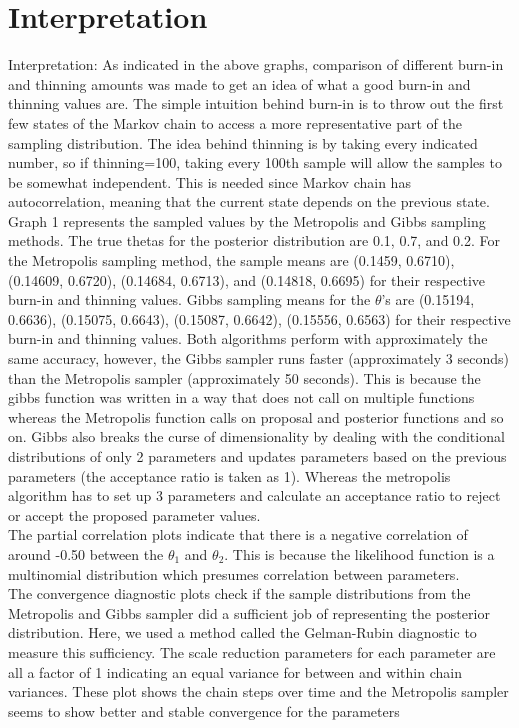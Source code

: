 \documentclass[11pt,a4paper]{article}
\begin{document}
\section*{Interpretation}
Interpretation:
As indicated in the above graphs, comparison of different burn-in and thinning amounts was made to get an idea of what a good burn-in and thinning values are. The simple intuition behind burn-in is to throw out the first few states of the Markov chain to access a more representative part of the sampling distribution. The idea behind thinning is by taking every indicated number, so if thinning=100, taking every 100th sample will allow the samples to be somewhat independent. This is needed since Markov chain has autocorrelation, meaning that the current state depends on the previous state. \\

Graph 1 represents the sampled values by the Metropolis and Gibbs sampling methods. The true thetas for the posterior distribution are 0.1, 0.7, and 0.2. For the Metropolis sampling method, the sample means are (0.1459, 0.6710), (0.14609, 0.6720), (0.14684, 0.6713), and (0.14818, 0.6695) for their respective burn-in and thinning values. Gibbs sampling means for the $\theta$'s are (0.15194, 0.6636), (0.15075, 0.6643), (0.15087, 0.6642), (0.15556, 0.6563) for their respective burn-in and thinning values. Both algorithms perform with approximately the same accuracy, however, the Gibbs sampler runs faster (approximately 3 seconds) than the Metropolis sampler (approximately 50 seconds). This is because the gibbs function was written in a way that does not call on multiple functions whereas the Metropolis function calls on proposal and posterior functions and so on. Gibbs also breaks the curse of dimensionality by dealing with the conditional distributions of only 2 parameters and updates parameters based on the previous parameters (the acceptance ratio is taken as 1). Whereas the metropolis algorithm has to set up 3 parameters and calculate an acceptance ratio to reject or accept the proposed parameter values. \\

The partial correlation plots indicate that there is a negative correlation of around -0.50 between the $\theta_{1}$ and $\theta_{2}$. This is because the likelihood function is a multinomial distribution which presumes correlation between parameters. \\

The convergence diagnostic plots check if the sample distributions from the Metropolis and  Gibbs sampler did a sufficient job of representing the posterior distribution. Here, we used a method called the Gelman-Rubin diagnostic to measure this sufficiency. The scale reduction parameters for each parameter are all a factor of 1 indicating  an equal variance for between and within chain variances. These plot shows the chain steps over time and the Metropolis sampler seems to show better and stable convergence for the parameters
\end{document}
